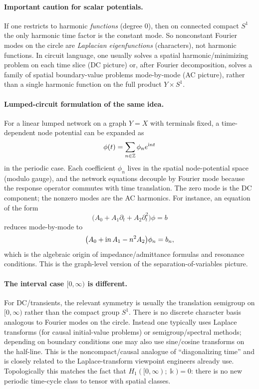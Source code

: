 \documentclass[11pt]{article}
\begin{document}
\paragraph{Important caution for scalar potentials.}
If one restricts to harmonic \emph{functions} (degree $0$), then on connected compact $S^1$ the only harmonic time factor is the constant mode.
So nonconstant Fourier modes on the circle are \emph{Laplacian eigenfunctions} (characters), not harmonic functions.
In circuit language, one usually solves a spatial harmonic/minimizing problem on each time slice (DC picture) or, after Fourier decomposition, solves a family of spatial boundary-value problems mode-by-mode (AC picture), rather than a single harmonic function on the full product $Y\times S^1$.

\paragraph{Lumped-circuit formulation of the same idea.}
For a linear lumped network on a graph $Y=X$ with terminals fixed, a time-dependent node potential can be expanded as
\[
\phi(t)=\sum_{n\in\mathbb{Z}} \phi_n e^{\mathrm{i} n t}
\]
in the periodic case.
Each coefficient $\phi_n$ lives in the spatial node-potential space (modulo gauge), and the network equations decouple by Fourier mode because the response operator commutes with time translation.
The zero mode is the DC component; the nonzero modes are the AC harmonics.
For instance, an equation of the form
\[
\big(A_0 + A_1\partial_t + A_2\partial_t^2\big)\phi = b
\]
reduces mode-by-mode to
\[
\big(A_0 + \mathrm{i} n\,A_1 - n^2 A_2\big)\phi_n = b_n,
\]
which is the algebraic origin of impedance/admittance formulas and resonance conditions.
This is the graph-level version of the separation-of-variables picture.

\paragraph{The interval case \texorpdfstring{$[0,\infty)$}{[0,infty)} is different.}
For DC/transients, the relevant symmetry is usually the translation semigroup on $[0,\infty)$ rather than the compact group $S^1$.
There is no discrete character basis analogous to Fourier modes on the circle.
Instead one typically uses Laplace transforms (for causal initial-value problems) or semigroup/spectral methods; depending on boundary conditions one may also use sine/cosine transforms on the half-line.
This is the noncompact/causal analogue of ``diagonalizing time'' and is closely related to the Laplace-transform viewpoint engineers already use.
Topologically this matches the fact that $H_1([0,\infty);\Bbbk)=0$: there is no new periodic time-cycle class to tensor with spatial classes.
\end{document}
